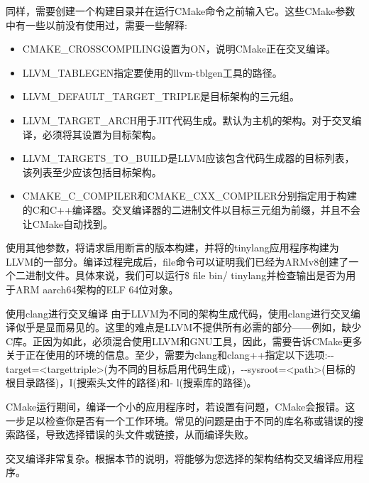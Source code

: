 同样，需要创建一个构建目录并在运行CMake命令之前输入它。这些CMake参数中有一些以前没有使用过，需要一些解释:

\begin{itemize}
\item
CMAKE\_CROSSCOMPILING设置为ON，说明CMake正在交叉编译。

\item
LLVM\_TABLEGEN指定要使用的llvm-tblgen工具的路径。

\item
LLVM\_DEFAULT\_TARGET\_TRIPLE是目标架构的三元组。

\item
LLVM\_TARGET\_ARCH用于JIT代码生成。默认为主机的架构。对于交叉编译，必须将其设置为目标架构。

\item
LLVM\_TARGETS\_TO\_BUILD是LLVM应该包含代码生成器的目标列表，该列表至少应该包括目标架构。

\item
CMAKE\_C\_COMPILER和CMAKE\_CXX\_COMPILER分别指定用于构建的C和C++编译器。交叉编译器的二进制文件以目标三元组为前缀，并且不会让CMake自动找到。
\end{itemize}

使用其他参数，将请求启用断言的版本构建，并将的tinylang应用程序构建为LLVM的一部分。编译过程完成后，file命令可以证明我们已经为ARMv8创建了一个二进制文件。具体来说，我们可以运行\$ file bin/ tinylang并检查输出是否为用于ARM aarch64架构的ELF 64位对象。

\begin{myTip}{使用clang进行交叉编译}
由于LLVM为不同的架构生成代码，使用clang进行交叉编译似乎是显而易见的。这里的难点是LLVM不提供所有必需的部分——例如，缺少C库。正因为如此，必须混合使用LLVM和GNU工具，因此，需要告诉CMake更多关于正在使用的环境的信息。至少，需要为clang和clang++指定以下选项:-{}-target=<targettriple>(为不同的目标启用代码生成)，-{}-sysroot=<path>(目标的根目录路径)，I(搜索头文件的路径)和- l(搜索库的路径)。

CMake运行期间，编译一个小的应用程序时，若设置有问题，CMake会报错。这一步足以检查你是否有一个工作环境。常见的问题是由于不同的库名称或错误的搜索路径，导致选择错误的头文件或链接，从而编译失败。
\end{myTip}

交叉编译非常复杂。根据本节的说明，将能够为您选择的架构结构交叉编译应用程序。

























